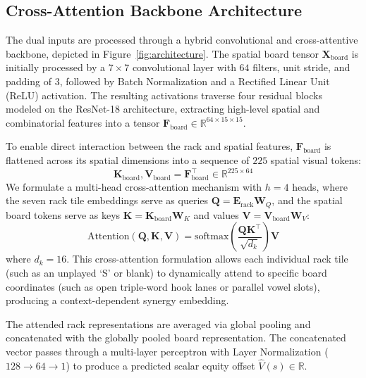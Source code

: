 \subsection{Cross-Attention Backbone Architecture}

The dual inputs are processed through a hybrid convolutional and cross-attentive backbone, depicted in Figure~\ref{fig:architecture}. The spatial board tensor $\mathbf{X}_{\mathrm{board}}$ is initially processed by a $7 \times 7$ convolutional layer with $64$ filters, unit stride, and padding of $3$, followed by Batch Normalization and a Rectified Linear Unit (ReLU) activation. The resulting activations traverse four residual blocks modeled on the ResNet-18 architecture, extracting high-level spatial and combinatorial features into a tensor $\mathbf{F}_{\mathrm{board}} \in \mathbb{R}^{64 \times 15 \times 15}$.

To enable direct interaction between the rack and spatial features, $\mathbf{F}_{\mathrm{board}}$ is flattened across its spatial dimensions into a sequence of $225$ spatial visual tokens:
\begin{equation}
    \mathbf{K}_{\mathrm{board}}, \mathbf{V}_{\mathrm{board}} = \mathbf{F}_{\mathrm{board}}^{\top} \in \mathbb{R}^{225 \times 64}
\end{equation}
We formulate a multi-head cross-attention mechanism with $h = 4$ heads, where the seven rack tile embeddings serve as queries $\mathbf{Q} = \mathbf{E}_{\mathrm{rack}} \mathbf{W}_Q$, and the spatial board tokens serve as keys $\mathbf{K} = \mathbf{K}_{\mathrm{board}} \mathbf{W}_K$ and values $\mathbf{V} = \mathbf{V}_{\mathrm{board}} \mathbf{W}_V$:
\begin{equation}
    \mathrm{Attention}(\mathbf{Q}, \mathbf{K}, \mathbf{V}) = \mathrm{softmax}\left( \frac{\mathbf{Q} \mathbf{K}^\top}{\sqrt{d_k}} \right) \mathbf{V}
\end{equation}
where $d_k = 16$. This cross-attention formulation allows each individual rack tile (such as an unplayed `S' or blank) to dynamically attend to specific board coordinates (such as open triple-word hook lanes or parallel vowel slots), producing a context-dependent synergy embedding.

The attended rack representations are averaged via global pooling and concatenated with the globally pooled board representation. The concatenated vector passes through a multi-layer perceptron with Layer Normalization ($128 \to 64 \to 1$) to produce a predicted scalar equity offset $\hat{V}(s) \in \mathbb{R}$.

